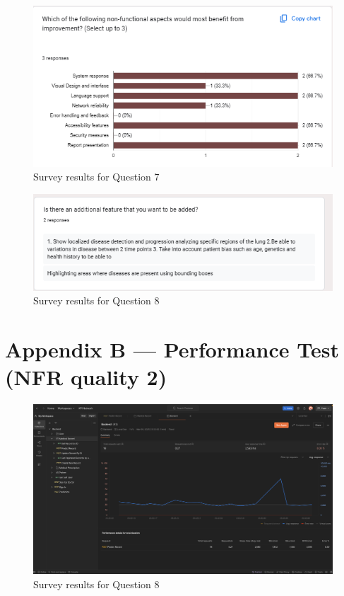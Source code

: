 \documentclass[12pt, titlepage]{article}
\begin{document}
  \begin{figure}[ht!]
    \centering
    \includegraphics[scale=1.5]{../assets/s7.png}
    \caption{Survey results for Question 7}
    \label{fig:survey7}
  \end{figure}
  
  \begin{figure}[ht!]
    \centering
    \includegraphics[scale=1.5]{../assets/s8.png}
    \caption{Survey results for Question 8}
    \label{fig:survey8}
  \end{figure}

\clearpage

\section*{Appendix B --- Performance Test (NFR quality 2)}
\begin{figure}[ht!]
  \centering
  \includegraphics[scale=0.24]{../assets/Perf.png}
  \caption{Survey results for Question 8}
  \label{fig:survey8}
\end{figure}
\end{document}

